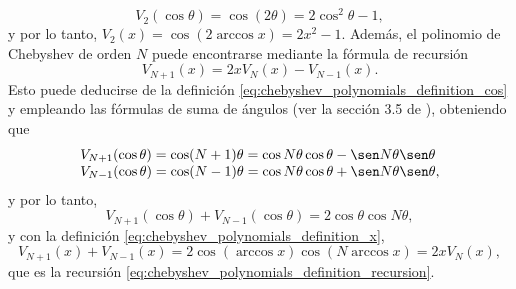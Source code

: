 \documentclass[a4paper]{report}
\begin{document}
\[
 V_2(\cos\theta)=\cos(2\theta)=2\cos^2\theta-1,
\]
y por lo tanto, \(V_2(x)=\cos(2\arccos x)=2x^2-1\). Además, el polinomio de Chebyshev de orden \(N\) puede encontrarse mediante la fórmula de recursión 
\begin{equation}\label{eq:chebyshev_polynomials_definition_recursion}
 V_{N+1}(x)=2xV_N(x)-V_{N-1}(x). 
\end{equation}
Esto puede deducirse de la definición \ref{eq:chebyshev_polynomials_definition_cos} y empleando las fórmulas de suma de ángulos (ver la sección 3.5 de \cite{daniels1974approximation}), obteniendo que
\[
 \begin{array}{l}
  V_{N+1}(\cos\theta)=\cos(N+1)\theta=\cos N\theta\cos\theta-\sen N\theta\sen\theta\\
  V_{N-1}(\cos\theta)=\cos(N-1)\theta=\cos N\theta\cos\theta+\sen N\theta\sen\theta,
 \end{array}
\]
y por lo tanto,
\[
 V_{N+1}(\cos\theta)+V_{N-1}(\cos\theta)=2\cos\theta\cos N\theta,
\]
y con la definición \ref{eq:chebyshev_polynomials_definition_x},
\[
 V_{N+1}(x)+V_{N-1}(x)=2\cos(\arccos x)\cos(N\arccos x)=2xV_N(x),
\]
que es la recursión \ref{eq:chebyshev_polynomials_definition_recursion}.
\end{document}
